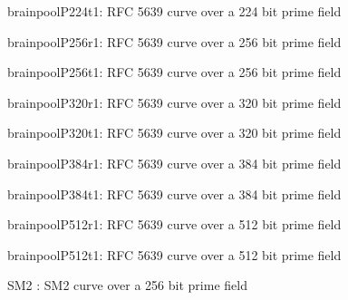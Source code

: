 \item   brainpoolP224t1: RFC 5639 curve over a 224 bit prime field
\item   brainpoolP256r1: RFC 5639 curve over a 256 bit prime field
\item   brainpoolP256t1: RFC 5639 curve over a 256 bit prime field
\item   brainpoolP320r1: RFC 5639 curve over a 320 bit prime field
\item   brainpoolP320t1: RFC 5639 curve over a 320 bit prime field
\item   brainpoolP384r1: RFC 5639 curve over a 384 bit prime field
\item   brainpoolP384t1: RFC 5639 curve over a 384 bit prime field
\item   brainpoolP512r1: RFC 5639 curve over a 512 bit prime field
\item   brainpoolP512t1: RFC 5639 curve over a 512 bit prime field
\item   SM2       : SM2 curve over a 256 bit prime field